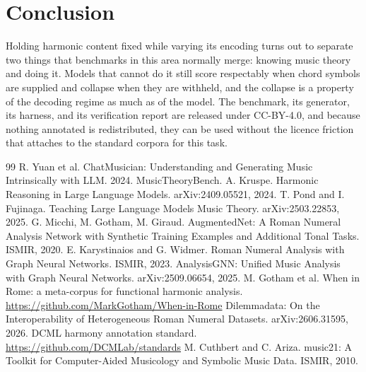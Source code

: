 \documentclass[11pt]{article}
\begin{document}
\section{Conclusion}

Holding harmonic content fixed while varying its encoding turns out to separate
two things that benchmarks in this area normally merge: knowing music theory and
doing it. Models that cannot do it still score respectably when chord symbols are
supplied and collapse when they are withheld, and the collapse is a property of
the decoding regime as much as of the model. The benchmark, its generator, its
harness, and its verification report are released under CC-BY-4.0, and because
nothing annotated is redistributed, they can be used without the licence
friction that attaches to the standard corpora for this task.

\begin{thebibliography}{99}
 R. Yuan et al. ChatMusician: Understanding and Generating
Music Intrinsically with LLM. 2024. MusicTheoryBench.
 A. Kruspe. Harmonic Reasoning in Large Language Models.
arXiv:2409.05521, 2024.
 T. Pond and I. Fujinaga. Teaching Large Language Models Music
Theory. arXiv:2503.22853, 2025.
 G. Micchi, M. Gotham, M. Giraud. AugmentedNet: A Roman
Numeral Analysis Network with Synthetic Training Examples and Additional Tonal
Tasks. ISMIR, 2020.
 E. Karystinaios and G. Widmer. Roman Numeral Analysis with Graph
Neural Networks. ISMIR, 2023.
 AnalysisGNN: Unified Music Analysis with Graph Neural
Networks. arXiv:2509.06654, 2025.
 M. Gotham et al. When in Rome: a meta-corpus for functional
harmonic analysis. \url{https://github.com/MarkGotham/When-in-Rome}
 Dilemmadata: On the Interoperability of Heterogeneous Roman
Numeral Datasets. arXiv:2606.31595, 2026.
 DCML harmony annotation standard.
\url{https://github.com/DCMLab/standards}
 M. Cuthbert and C. Ariza. music21: A Toolkit for
Computer-Aided Musicology and Symbolic Music Data. ISMIR, 2010.
\end{thebibliography}
\end{document}
